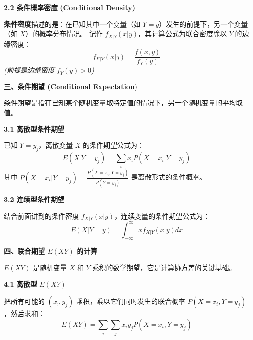 \documentclass[10pt]{article}
\numberwithin{equation}{section}
\theoremstyle{plain}
\theoremstyle{definition}
\theoremstyle{remark}
\begin{document}
{\par\vspace{0.8ex}\noindent\normalsize\bfseries\color{accentD} 2.2 条件概率密度 (Conditional Density)\par}
\textbf{条件密度}描述的是：在已知其中一个变量（如 $Y=y$）发生的前提下，另一个变量（如 $X$）的概率分布情况。
记作 $f_{X|Y}(x|y)$，其计算公式为联合密度除以 $Y$ 的边缘密度：
\[ \displaystyle f_{X|Y}(x|y) = \frac{f(x, y)}{f_Y(y)} \]
\textit{(前提是边缘密度 $f_Y(y) > 0$)}

{\par\vspace{1ex}\noindent\large\bfseries\color{brandD} 三、条件期望 (Conditional Expectation)\par}\par\vspace{0.5ex}
条件期望是指在已知某个随机变量取特定值的情况下，另一个随机变量的平均取值。

{\par\vspace{0.8ex}\noindent\normalsize\bfseries\color{secblue} 3.1 离散型条件期望\par}
已知 $Y = y_j$，离散变量 $X$ 的条件期望公式为：
\[ \displaystyle E(X | Y=y_j) = \sum_{i} x_i P(X=x_i | Y=y_j) \]
其中 $\displaystyle P(X=x_i | Y=y_j) = \frac{P(X=x_i, Y=y_j)}{P(Y=y_j)}$ 是离散形式的条件概率。

{\par\vspace{0.8ex}\noindent\normalsize\bfseries\color{accentD} 3.2 连续型条件期望\par}
结合前面讲到的条件密度 $f_{X|Y}(x|y)$，连续变量的条件期望公式为：
\[ \displaystyle E(X | Y=y) = \int_{-\infty}^{\infty} x f_{X|Y}(x|y) dx \]

{\par\vspace{1ex}\noindent\large\bfseries\color{brandD} 四、联合期望 $E(XY)$ 的计算\par}\par\vspace{0.5ex}
$E(XY)$ 是随机变量 $X$ 和 $Y$ 乘积的数学期望，它是计算协方差的关键基础。

{\par\vspace{0.8ex}\noindent\normalsize\bfseries\color{secblue} 4.1 离散型 $E(XY)$\par}
把所有可能的 $(x_i, y_j)$ 乘积，乘以它们同时发生的联合概率 $P(X=x_i, Y=y_j)$，然后求和：
\[ \displaystyle E(XY) = \sum_{i} \sum_{j} x_i y_j P(X=x_i, Y=y_j) \]
\end{document}
